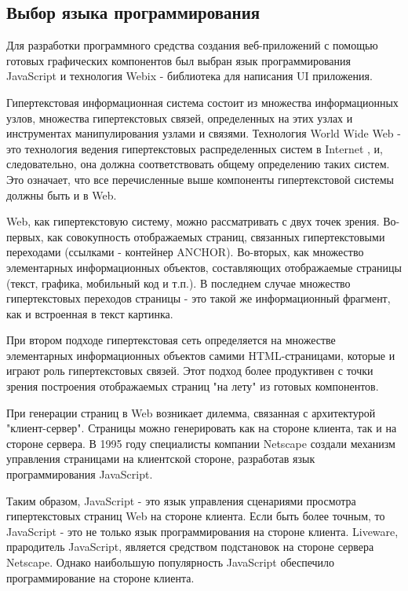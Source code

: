 \subsection{Выбор языка программирования}
\label{sec:modeling:language}

Для разработки программного средства создания веб-приложений с помощью 
готовых графических компонентов был выбран язык программирования JavaScript и технология Webix - библиотека для написания UI приложения.

Гипертекстовая информационная система состоит из множества информационных узлов, множества гипертекстовых связей, определенных на этих узлах и инструментах манипулирования узлами и связями. Технология World Wide Web - это технология ведения гипертекстовых распределенных систем в Internet , и, следовательно, она должна соответствовать общему определению таких систем. Это означает, что все перечисленные выше компоненты гипертекстовой системы должны быть и в Web.

Web, как гипертекстовую систему, можно рассматривать с двух точек зрения. Во-первых, как совокупность отображаемых страниц, связанных гипертекстовыми переходами (ссылками - контейнер ANCHOR). Во-вторых, как множество элементарных информационных объектов, составляющих отображаемые страницы (текст, графика, мобильный код и т.п.). В последнем случае множество гипертекстовых переходов страницы - это такой же информационный фрагмент, как и встроенная в текст картинка.

При втором подходе гипертекстовая сеть определяется на множестве элементарных информационных объектов самими HTML-страницами, которые и играют роль гипертекстовых связей. Этот подход более продуктивен с точки зрения построения отображаемых страниц "на лету" из готовых компонентов.

При генерации страниц в Web возникает дилемма, связанная с архитектурой "клиент-сервер". Страницы можно генерировать как на стороне клиента, так и на стороне сервера. В 1995 году специалисты компании Netscape создали механизм управления страницами на клиентской стороне, разработав язык программирования JavaScript.

Таким образом, JavaScript - это язык управления сценариями просмотра гипертекстовых страниц Web на стороне клиента. Если быть более точным, то JavaScript - это не только язык программирования на стороне клиента. Liveware, прародитель JavaScript, является средством подстановок на стороне сервера Netscape. Однако наибольшую популярность JavaScript обеспечило программирование на стороне клиента.

